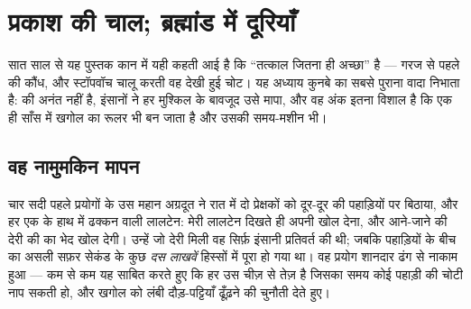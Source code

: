 \chapter{प्रकाश की चाल; ब्रह्मांड में दूरियाँ}\label{ch:g8:speed-of-light}

सात साल से यह पुस्तक कान में यही कहती आई है कि  ``तत्काल जितना
ही अच्छा'' है --- गरज से पहले की कौंध, और स्टॉपवॉच चालू करती वह देखी
हुई चोट। यह अध्याय कुनबे का सबसे पुराना वादा निभाता है:  की 
अनंत नहीं है, इंसानों ने हर मुश्किल के बावजूद उसे मापा, और वह अंक इतना
विशाल है कि एक ही साँस में खगोल का रूलर भी बन जाता है और उसकी समय-मशीन
भी।

\section{वह नामुमकिन मापन}

\begin{example}[दो पहाड़ियों पर लालटेनें]\label{ex:g8:speed-of-light:galileo}
चार सदी पहले प्रयोगों के उस महान अग्रदूत ने रात में दो प्रेक्षकों को
दूर-दूर की पहाड़ियों पर बिठाया, और हर एक के हाथ में ढक्कन वाली लालटेन:
मेरी लालटेन दिखते ही अपनी खोल देना, और आने-जाने की देरी  की 
का भेद खोल देगी। उन्हें जो देरी मिली वह सिर्फ़ इंसानी प्रतिवर्त की थी;
जबकि पहाड़ियों के बीच  का असली सफ़र सेकंड के कुछ \emph{दस लाखवें}
हिस्सों में पूरा हो गया था। वह प्रयोग शानदार ढंग से नाकाम हुआ ---
कम से कम यह साबित करते हुए कि  हर उस चीज़ से तेज़ है जिसका समय
कोई पहाड़ी की चोटी नाप सकती हो, और खगोल को लंबी दौड़-पट्टियाँ ढूँढ़ने
की चुनौती देते हुए।
\end{example}

